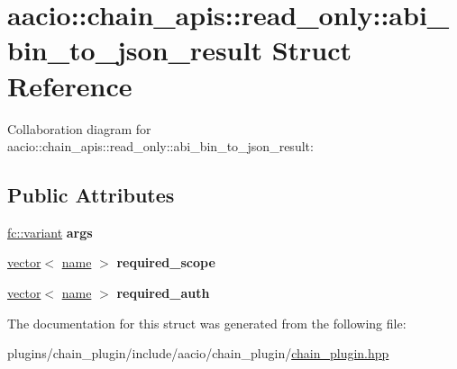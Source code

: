 \hypertarget{structaacio_1_1chain__apis_1_1read__only_1_1abi__bin__to__json__result}{}\section{aacio\+:\+:chain\+\_\+apis\+:\+:read\+\_\+only\+:\+:abi\+\_\+bin\+\_\+to\+\_\+json\+\_\+result Struct Reference}
\label{structaacio_1_1chain__apis_1_1read__only_1_1abi__bin__to__json__result}


Collaboration diagram for aacio\+:\+:chain\+\_\+apis\+:\+:read\+\_\+only\+:\+:abi\+\_\+bin\+\_\+to\+\_\+json\+\_\+result\+:
\subsection*{Public Attributes}
\begin{DoxyCompactItemize}
\item 
\mbox{\label{structaacio_1_1chain__apis_1_1read__only_1_1abi__bin__to__json__result_a25b80c740e3999a76bb736be5a6a3f17}} 
\mbox{\hyperlink{classfc_1_1variant}{fc\+::variant}} {\bfseries args}
\item 
\mbox{\label{structaacio_1_1chain__apis_1_1read__only_1_1abi__bin__to__json__result_abaded3ca452f32b1822576e30890c643}} 
\mbox{\hyperlink{classstd_1_1vector}{vector}}$<$ \mbox{\hyperlink{structaacio_1_1name}{name}} $>$ {\bfseries required\+\_\+scope}
\item 
\mbox{\label{structaacio_1_1chain__apis_1_1read__only_1_1abi__bin__to__json__result_ac5f06775bcd55abd1ca0179d8f83b9d8}} 
\mbox{\hyperlink{classstd_1_1vector}{vector}}$<$ \mbox{\hyperlink{structaacio_1_1name}{name}} $>$ {\bfseries required\+\_\+auth}
\end{DoxyCompactItemize}


The documentation for this struct was generated from the following file\+:\begin{DoxyCompactItemize}
\item 
plugins/chain\+\_\+plugin/include/aacio/chain\+\_\+plugin/\mbox{\hyperlink{chain__plugin_8hpp}{chain\+\_\+plugin.\+hpp}}\end{DoxyCompactItemize}
